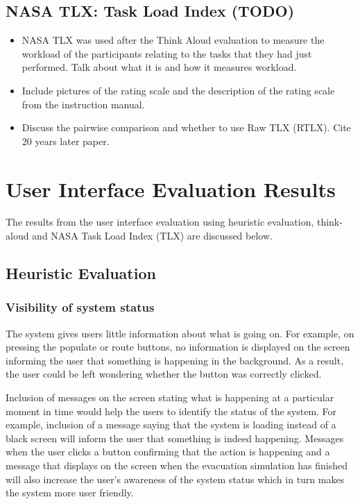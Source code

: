 \subsection{NASA TLX: Task Load Index (TODO)}
\begin{itemize}
\item NASA TLX was used after the Think Aloud evaluation to measure the workload of the participants relating to the tasks that they had just performed. Talk about what it is and how it measures workload.
\item Include pictures of the rating scale and the description of the rating scale from the instruction manual.
\item Discuss the pairwise comparison and whether to use Raw TLX (RTLX). Cite 20 years later paper.
\end{itemize}

\section{User Interface Evaluation Results}
\label{results}

The results from the user interface evaluation using heuristic evaluation, think-aloud and NASA Task Load Index (TLX) are discussed below.

\subsection{Heuristic Evaluation}
\subsubsection{Visibility of system status}
The system gives users little information about what is going on. For example, on pressing the populate or route buttons, no information is displayed on the screen informing the user that something is happening in the background. As a result, the user could be left wondering whether the button was correctly clicked.

Inclusion of messages on the screen stating what is happening at a particular moment in time would help the users to identify the status of the system. For example, inclusion of a message saying that the system is loading instead of a black screen will inform the user that something is indeed happening. Messages when the user clicks a button confirming that the action is happening and a message that displays on the screen when the evacuation simulation has finished will also increase the user’s awareness of the system status which in turn makes the system more user friendly.

